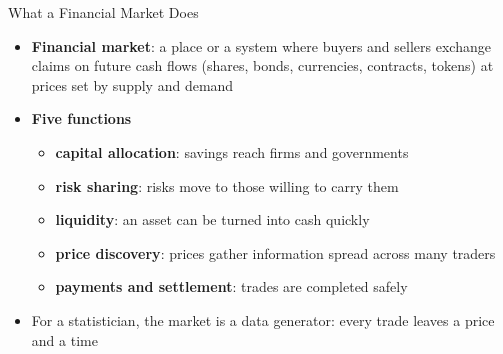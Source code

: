 \begin{frame}{What a Financial Market Does}
\itemsize{\small}
\begin{itemize}
    \item \textbf{Financial market}: a place or a system where buyers and sellers exchange claims on future cash flows (shares, bonds, currencies, contracts, tokens) at prices set by supply and demand
    \item \textbf{Five functions}
    \begin{itemize}
        \item \textbf{capital allocation}: savings reach firms and governments
        \item \textbf{risk sharing}: risks move to those willing to carry them
        \item \textbf{liquidity}: an asset can be turned into cash quickly
        \item \textbf{price discovery}: prices gather information spread across many traders
        \item \textbf{payments and settlement}: trades are completed safely
    \end{itemize}
    \item For a statistician, the market is a data generator: every trade leaves a price and a time
\end{itemize}
\end{frame}

